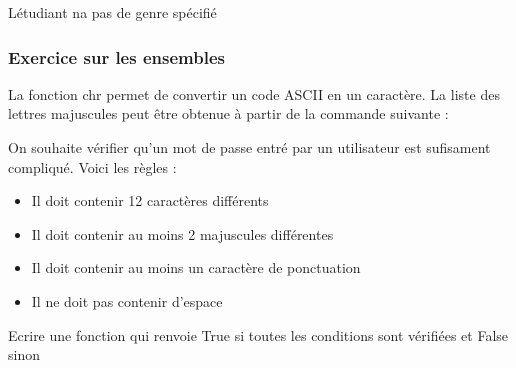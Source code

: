 \documentclass[letterpaper,10pt,english]{sphinxhowto}
\begin{document}
\begin{sphinxVerbatim}[commandchars=\\\{\}]
L\PYGZsq{}étudiant n\PYGZsq{}a pas de genre spécifié
\end{sphinxVerbatim}


\subsubsection{Exercice sur les ensembles}
\label{\detokenize{cours3_conteneur_corr_exercices:exercice-sur-les-ensembles}}
\sphinxAtStartPar
La fonction chr permet de convertir un code ASCII en un caractère. La liste des lettres majuscules peut être obtenue à partir de la commande suivante :

\begin{sphinxVerbatim}[commandchars=\\\{\}]
  \PYG{p}{[}    \PYG{p}{]}
\end{sphinxVerbatim}

\sphinxAtStartPar
On souhaite vérifier qu’un mot de passe entré par un utilisateur est sufisament compliqué. Voici les règles :
\begin{itemize}
\item {} 
\sphinxAtStartPar
Il doit contenir 12 caractères différents

\item {} 
\sphinxAtStartPar
Il doit contenir au moins 2 majuscules différentes

\item {} 
\sphinxAtStartPar
Il doit contenir au moins un caractère de ponctuation 

\item {} 
\sphinxAtStartPar
Il ne doit pas contenir d’espace

\end{itemize}

\sphinxAtStartPar
Ecrire une fonction qui renvoie True si toutes les conditions sont vérifiées et False sinon
\end{document}
